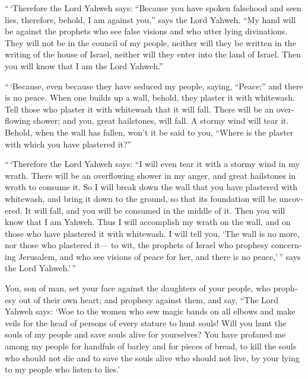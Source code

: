 \begin{paracol}{2}
\begin{otherlanguage}{english}
 ``\,`Therefore the Lord Yahweh says: ``Because you have
spoken falsehood and seen lies, therefore, behold, I am against you,''
says the Lord Yahweh.  ``My hand will be against the
prophets who see false visions and who utter lying divinations. They
will not be in the council of my people, neither will they be written in
the writing of the house of Israel, neither will they enter into the
land of Israel. Then you will know that I am the Lord Yahweh.''

 ``\,`Because, even because they have seduced my people,
saying, ``Peace;'' and there is no peace. When one builds up a wall,
behold, they plaster it with whitewash.  Tell those who
plaster it with whitewash that it will fall. There will be an
overflowing shower; and you, great hailstones, will fall. A stormy wind
will tear it.  Behold, when the wall has fallen, won't it
be said to you, ``Where is the plaster with which you have plastered
it?''

 ``\,`Therefore the Lord Yahweh says: ``I will even tear
it with a stormy wind in my wrath. There will be an overflowing shower
in my anger, and great hailstones in wrath to consume it.
 So I will break down the wall that you have plastered
with whitewash, and bring it down to the ground, so that its foundation
will be uncovered. It will fall, and you will be consumed in the middle
of it. Then you will know that I am Yahweh.  Thus I will
accomplish my wrath on the wall, and on those who have plastered it with
whitewash. I will tell you, `The wall is no more, nor those who
plastered it---  to wit, the prophets of Israel who
prophesy concerning Jerusalem, and who see visions of peace for her, and
there is no peace,'\,'' says the Lord Yahweh.'\,''

 You, son of man, set your face against the daughters of
your people, who prophesy out of their own heart; and prophesy against
them,  and say, ``The Lord Yahweh says: `Woe to the women
who sew magic bands on all elbows and make veils for the head of persons
of every stature to hunt souls! Will you hunt the souls of my people and
save souls alive for yourselves?  You have profaned me
among my people for handfuls of barley and for pieces of bread, to kill
the souls who should not die and to save the souls alive who should not
live, by your lying to my people who listen to lies.'


\end{otherlanguage}
\end{paracol}
